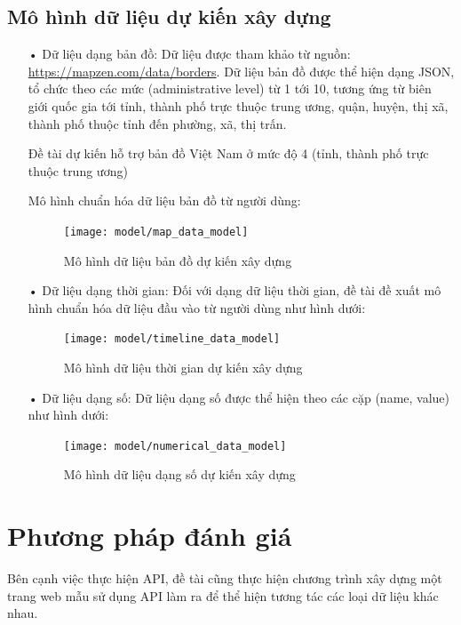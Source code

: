 \documentclass[12pt,a4paper,oneside]{article}
\begin{document}
\subsection{Mô hình dữ liệu dự kiến xây dựng}
\begin{itemize}
\item[•] Dữ liệu dạng bản đồ: 
Dữ liệu được tham khảo từ nguồn: \href{https://mapzen.com/data/borders}{https://mapzen.com/data/borders}. 
Dữ liệu bản đồ được thể hiện dạng JSON, tổ chức theo các mức (administrative level) từ 1 tới 10, tương ứng từ biên giới quốc gia tới tỉnh, thành phố trực thuộc trung ương, quận, huyện, thị xã, thành phố thuộc tỉnh đến phường, xã, thị trấn.

Đề tài dự kiến hỗ trợ bản đồ Việt Nam ở mức độ 4 (tỉnh, thành phố trực thuộc trung ương)

Mô hình chuẩn hóa dữ liệu bản đồ từ người dùng:
\begin{figure}[htp]
	\begin{center}
    \texttt{[image: model/map\_data\_model]}
    \caption{Mô hình dữ liệu bản đồ dự kiến xây dựng}
    \label{refhinh17}
    \end{center}
\end{figure}

\item[•] Dữ liệu dạng thời gian:
Đối với dạng dữ liệu thời gian, đề tài đề xuất mô hình chuẩn hóa dữ liệu đầu vào từ người dùng như hình dưới:
\begin{figure}[htp]
	\begin{center}
    \texttt{[image: model/timeline\_data\_model]}
    \caption{Mô hình dữ liệu thời gian dự kiến xây dựng}
    \label{refhinh18}
    \end{center}
\end{figure}

\item[•] Dữ liệu dạng số:
Dữ liệu dạng số được thể hiện theo các cặp (name, value) như hình dưới:
\begin{figure}[htp]
	\begin{center}
    \texttt{[image: model/numerical\_data\_model]}
    \caption{Mô hình dữ liệu dạng số dự kiến xây dựng}
    \label{refhinh19}
    \end{center}
\end{figure}

\end{itemize}

\section{Phương pháp đánh giá}
Bên cạnh việc thực hiện API, đề tài cũng thực hiện chương trình xây dựng một trang web mẫu sử dụng API làm ra để thể hiện tương tác các loại dữ liệu khác nhau.
\end{document}

